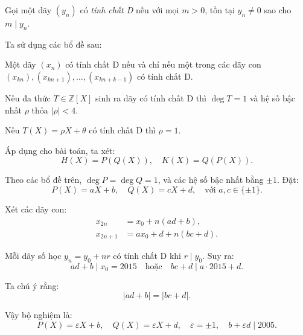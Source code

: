 \documentclass[../07-integer-polynomials.tex]{subfiles}
\begin{document}
\begin{soln}\footnotemark
    Gọi một dãy \( (y_n) \) có \textit{tính chất D} nếu với mọi \( m > 0 \), tồn tại \( y_n \ne 0 \) sao cho \( m \mid y_n \).

    Ta sử dụng các bổ đề sau:
    \begin{claim*}[Bổ đề 1]
        Một dãy \( (x_n) \) có tính chất D nếu và chỉ nếu một trong các dãy con \( (x_{kn}), (x_{kn+1}), \dots, (x_{kn + k - 1}) \) có tính chất D.
    \end{claim*}

    \begin{claim*}[Bổ đề 2]
        Nếu đa thức \( T \in \mathbb{Z}[X] \) sinh ra dãy có tính chất D thì \( \deg T = 1 \) và hệ số bậc nhất \( \rho \) thỏa \( |\rho| < 4 \).
    \end{claim*}

    \begin{claim*}[Bổ đề 3]
        Nếu \( T(X) = \rho X + \theta \) có tính chất D thì \( \rho = 1 \).
    \end{claim*}

    Áp dụng cho bài toán, ta xét:
    \[
        H(X) = P(Q(X)),\quad K(X) = Q(P(X)).
    \]
    
    Theo các bổ đề trên, \( \deg P = \deg Q = 1 \), và các hệ số bậc nhất bằng \( \pm 1 \). Đặt:
    \[
        P(X) = aX + b,\quad Q(X) = cX + d,\quad \text{với } a, c \in \{\pm 1\}.
    \]

    Xét các dãy con:
    \begin{align*}
        x_{2n} &= x_0 + n(ad + b), \\
        x_{2n+1} &= a x_0 + d + n(bc + d).
    \end{align*}

    Mỗi dãy số học \( y_n = y_0 + nr \) có tính chất D khi \( r \mid y_0 \). Suy ra:
    \[
        ad + b \mid x_0 = 2015 \quad \text{hoặc} \quad bc + d \mid a \cdot 2015 + d.
    \]

    Ta chú ý rằng:
    \[
        |ad + b| = |bc + d|.
    \]

    Vậy bộ nghiệm là:
    \[
        \boxed{
        P(X) = \varepsilon X + b,\quad Q(X) = \varepsilon X + d,\quad \varepsilon = \pm 1,\quad b + \varepsilon d \mid 2005.
        }
    \]
\end{soln}

\end{document}
